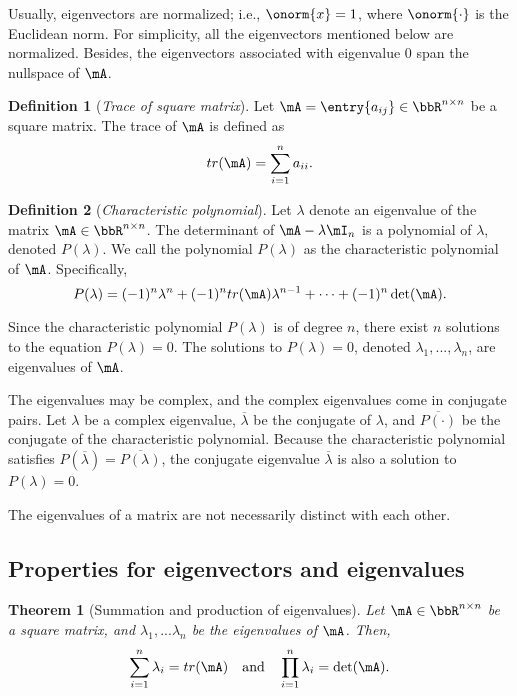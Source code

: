 \documentclass[11pt]{article}
\theoremstyle{plain}
\newtheorem{thm}{Theorem}[section]
\theoremstyle{definition}
\newtheorem{defn}{Definition}
\begin{document}
 Usually, eigenvectors are normalized; i.e., $\onorm{x} = 1$, where $\onorm{\cdot}$ is the Euclidean norm. For simplicity, all the eigenvectors mentioned below are normalized. Besides, the eigenvectors associated with eigenvalue 0 span the nullspace of $\mA$.

\begin{defn}[\textit{Trace of square matrix}]\label{def:trace}
Let $\mA = \entry{a_{ij}} \in \bbR^{n \times n}$ be a square matrix. The trace of $\mA$ is defined as
\[ tr(\mA) = \sum_{i = 1}^n a_{ii}.\] 
\end{defn}

\begin{defn}[\textit{Characteristic polynomial}]\label{def:charac}
	Let $\lambda$ denote an eigenvalue of the matrix $\mA\in \bbR^{n \times n}$.
	The determinant of $\mA - \lambda \mI_n$ is a polynomial of $\lambda$, denoted $P(\lambda)$. We call the polynomial $P(\lambda)$ as the characteristic polynomial of $\mA$. Specifically,
	\begin{equation}\label{def:charapoly}
		 P(\lambda)  = (-1)^n \lambda^n +  (-1)^n  tr(\mA)\lambda^{n-1} + \cdots + (-1)^n \det(\mA). 
	\end{equation}
\end{defn}

Since the characteristic polynomial $P(\lambda)$ is of degree $n$, there exist $n$ solutions to the equation $P(\lambda) = 0$. The solutions to $P(\lambda) = 0$, denoted $\lambda_1,...,\lambda_n$, are eigenvalues of $\mA$.

\vspace{0.2cm}
The eigenvalues may be complex, and the complex eigenvalues come in conjugate pairs. Let $\lambda$ be a complex eigenvalue, $\overline \lambda$ be the conjugate of $\lambda$, and $\overline{P(\cdot)}$ be the conjugate of the characteristic polynomial. Because the characteristic polynomial satisfies $P(\overline{ \lambda}) = \overline{ P(\lambda)}$, the conjugate eigenvalue $\overline \lambda$ is also a solution to $P(\lambda) = 0$. 

\vspace{0.2cm}
The eigenvalues of a matrix are not necessarily distinct with each other.


\subsection{Properties for eigenvectors and eigenvalues}

\begin{thm}[Summation and production of eigenvalues]\label{thm:speigen}
	Let  $\mA \in \bbR^{n \times n}$ be a square matrix, and $\lambda_1,...\lambda_n$ be the eigenvalues of $\mA$. Then,
	\begin{equation}
		\sum_{i=1}^n \lambda_i = tr(\mA)\quad \text{and} \quad \prod_{i=1}^n \lambda_i = \det(\mA).
	\end{equation} 
\end{thm}
\end{document}
